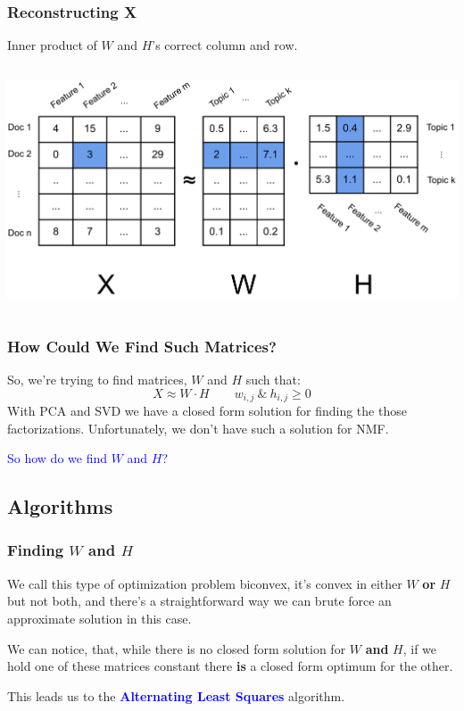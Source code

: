 \documentclass{beamer}
\begin{document}
\begin{frame}
  \frametitle{Reconstructing X}
  Inner product of $W$ and $H$'s correct column and row. \vspace{4mm}
  \begin{columns}
    \includegraphics[width=\textwidth]{images/x_w_h_reconstruction.png}
  \end{columns} \vspace{4mm}
\end{frame}

\begin{frame}
  \frametitle{How Could We Find Such Matrices?}
  So, we're trying to find matrices, $W$ and $H$ such that:
  $$ X \approx W \cdot H  \qquad w_{i, j}\: \& \: h_{i, j} \geq 0 $$
  With PCA and SVD we have a closed form solution for finding the those factorizations. Unfortunately, we don't have such a solution for NMF. \vspace{6mm} \pause

  \centering
  \textcolor{blue}{So how do we find $W$ and $H$?}
\end{frame}

\subsection{Algorithms}
\begin{frame}
  \frametitle{Finding $W$ and $H$}
  We call this type of optimization problem biconvex, it's convex in either $W$ \textbf{or} $H$ but not both, and there's a straightforward way we can brute force an approximate solution in this case. \vspace{4mm} \pause

  We can notice, that, while there is no closed form solution for $W$ \textbf{and} $H$, if we hold one of these matrices constant there \textbf{is} a closed form optimum for the other. \vspace{4mm}

  This leads us to the  \textbf{\textcolor{blue}{Alternating Least Squares}} algorithm.
\end{frame}
\end{document}
